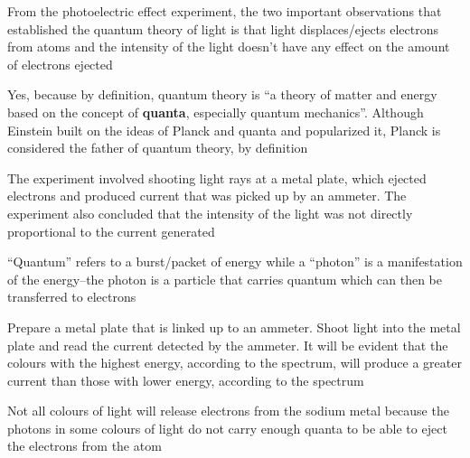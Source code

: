 \begin{solutions}
    \item From the photoelectric effect experiment, the two important observations that established
        the quantum theory of light is that light displaces/ejects electrons from atoms and
        the intensity of the light doesn't have any effect on the amount of electrons ejected
    \item Yes, because by definition, quantum theory is ``a theory of matter and energy based
        on the concept of \textbf{quanta}, especially quantum mechanics''. Although Einstein built
        on the ideas of Planck and quanta and popularized it, Planck is considered the father
        of quantum theory, by definition
    \item The experiment involved shooting light rays at a metal plate, which ejected electrons
        and produced current that was picked up by an ammeter. The experiment also concluded that
        the intensity of the light was not directly proportional to the current generated
    \item ``Quantum'' refers to a burst/packet of energy while a ``photon'' is a manifestation of
        the energy--the photon is a particle that carries quantum which can then be transferred 
        to electrons
    \item 
        \begin{enum-alph}
            \item Prepare a metal plate that is linked up to an ammeter. Shoot light into the
                metal plate and read the current detected by the ammeter. It will be evident
                that the colours with the highest energy, according to the spectrum, will
                produce a greater current than those with lower energy, according to the spectrum
            \item Not all colours of light will release electrons from the sodium metal because
                the photons in some colours of light do not carry enough quanta to be able to
                eject the electrons from the atom
        \end{enum-alph}
\end{solutions}
